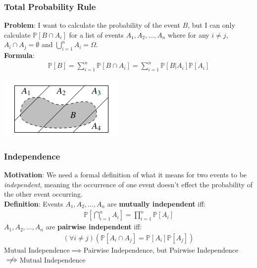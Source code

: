 \documentclass{beamer}
\begin{document}
\begin{frame}
    \frametitle{Total Probability Rule}
    {\bf Problem}: I want to calculate the probability of the event $B$, but I can only calculate $\mathbb{P}[B\cap A_i]$ for a list of events $A_1,A_2,\dots,A_n$ where for any $i\neq j$, $A_i\cap A_j=\emptyset$ and $\bigcup_{i=1}^n A_i=\Omega$.\\
    {\bf Formula}:
    \begin{gather*}
        \mathbb{P}[B]=\sum_{i=1}^n\mathbb{P}[B\cap A_i]=\sum_{i=1}^n\mathbb{P}[B|A_i]\mathbb{P}[A_i]
    \end{gather*}
    \begin{center}
        \includegraphics[scale=0.6]{Images/total-probability.png}
    \end{center}
\end{frame}

\begin{frame}
    \frametitle{Independence}
    {\bf Motivation}: We need a formal definition of what it means for two events to be {\it independent}, meaning the occurrence of one event doesn't effect the probability of the other event occurring.\\
    {\bf Definition}: Events $A_1,A_2,...,A_n$ are {\bf mutually independent} iff:
    \begin{gather*}
        \mathbb{P}\left[\bigcap_{i=1}^n A_i\right]=\prod_{i=1}^n\mathbb{P}[A_i]
    \end{gather*}
    $A_1,A_2,\dots,A_n$ are {\bf pairwise independent} iff:
    \begin{gather*}
        (\forall i\neq j)(\mathbb{P}[A_i\cap A_j]=\mathbb{P}[A_i]\mathbb{P}[A_j])
    \end{gather*}
    Mutual Independence$\implies$Pairwise Independence, but Pairwise Independence$\centernot\implies$Mutual Independence
\end{frame}
\end{document}
